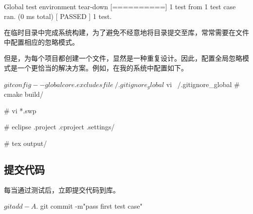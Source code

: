 \begin{content}
\begin{leftbar}
\begin{c++}[caption={\ttfamily{运行测试}}]
[----------] Global test environment tear-down
[==========] 1 test from 1 test case ran. (0 ms total)
[  PASSED  ] 1 test.
 \end{c++}
\end{leftbar}


\begin{story}
  \begin{center}
  \end{center}

\begin{content}

在临时目录中完成系统构建，为了避免不经意地将目录提交至库，常常需要在文件中配置相应的忽略模式。

但是，为每个项目都创建一个文件，显然是一种重复设计。因此，配置全局忽略模式是一个更恰当的解决方案。例如，在我的系统中配置如下。

\begin{leftbar}
 \begin{c++}[caption={\ttfamily{Git：配置全局忽略模式}}]
$ git config --global core.excludesfile ~/.gitignore_global
$ vi ~/.gitignore_global
# cmake
build/

# vi
*.swp

# eclipse
.project
.cproject
.settings/

# tex
output/
 \end{c++}
\end{leftbar}

\end{content}

\end{story}

\subsection{提交代码}

每当通过测试后，立即提交代码到库。

\begin{leftbar}
 \begin{c++}[caption={\ttfamily{提交代码}}]
$ git add -A .
$ git commit -m"pass first test case"
 \end{c++}
\end{leftbar}

\begin{story}
  \begin{center}
  \end{center}


\end{story}
\end{content}

